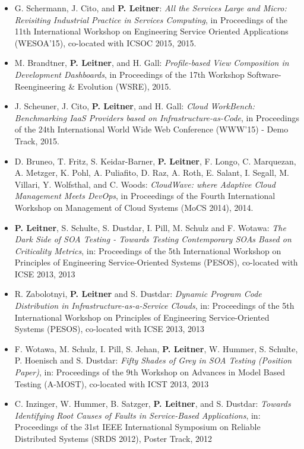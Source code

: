 \documentclass[paper=letter,fontsize=11pt]{scrartcl} %
\begin{document}
\begin{itemize}
    \item G. Schermann, J. Cito, and \textbf{P. Leitner}: \emph{All the Services Large and Micro: Revisiting Industrial Practice in Services Computing}, in Proceedings of the 11th International Workshop on Engineering Service Oriented Applications (WESOA’15), co-located with ICSOC 2015, 2015.
    \item M. Brandtner, \textbf{P. Leitner}, and H. Gall: \emph{Profile-based View Composition in Development Dashboards}, in Proceedings of the 17th Workshop Software-Reengineering \& Evolution (WSRE), 2015.
  \item J. Scheuner, J. Cito, \textbf{P. Leitner}, and H. Gall: \emph{Cloud WorkBench: Benchmarking IaaS Providers based on Infrastructure-as-Code}, in Proceedings of the 24th International World Wide Web Conference (WWW'15) - Demo Track, 2015.
 \item D. Bruneo, T. Fritz, S. Keidar-Barner, \textbf{P. Leitner}, F. Longo, C. Marquezan, A. Metzger, K. Pohl, A. Puliafito, D. Raz, A. Roth, E. Salant, I. Segall, M. Villari, Y. Wolfsthal, and C. Woods: \emph{CloudWave: where Adaptive Cloud Management Meets DevOps}, in Proceedings of the Fourth International Workshop on Management of Cloud Systems (MoCS 2014), 2014.
 \item \textbf{P. Leitner}, S. Schulte, S. Dustdar, I. Pill, M. Schulz and F. Wotawa: \emph{The Dark Side of SOA Testing - Towards Testing Contemporary SOAs Based on Criticality Metrics}, in: Proceedings of the 5th International Workshop on Principles of Engineering Service-Oriented Systems (PESOS), co-located with ICSE 2013, 2013
\item R. Zabolotnyi, \textbf{P. Leitner} and S. Dustdar: \emph{Dynamic Program Code Distribution in Infrastructure-as-a-Service Clouds}, in: Proceedings of the 5th International Workshop on Principles of Engineering Service-Oriented Systems (PESOS), co-located with ICSE 2013, 2013
\item F. Wotawa, M. Schulz, I. Pill, S. Jehan, \textbf{P. Leitner}, W. Hummer, S. Schulte, P. Hoenisch and S. Dustdar: \emph{Fifty Shades of Grey in SOA Testing (Position Paper)}, in: Proceedings of the 9th Workshop on Advances in Model Based Testing (A-MOST), co-located with ICST 2013, 2013
\item C. Inzinger, W. Hummer, B. Satzger, \textbf{P. Leitner}, and S. Dustdar:
\emph{Towards Identifying Root Causes of Faults in Service-Based Applications}, in: Proceedings of the 31st IEEE International Symposium on Reliable Distributed Systems (SRDS 2012), Poster Track, 2012

\end{itemize}
\end{document}
